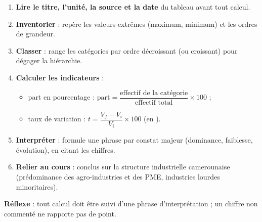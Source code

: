 \documentclass[11pt]{article}
\begin{document}
\begin{methode}
\begin{enumerate}
\item \textbf{Lire le titre, l'unité, la source et la date} du tableau avant tout calcul.
\item \textbf{Inventorier} : repère les valeurs extrêmes (maximum, minimum) et les ordres de grandeur.
\item \textbf{Classer} : range les catégories par ordre décroissant (ou croissant) pour dégager la hiérarchie.
\item \textbf{Calculer les indicateurs} :
\begin{itemize}
\item part en pourcentage : $\text{part} = \dfrac{\text{effectif de la catégorie}}{\text{effectif total}} \times 100$ ;
\item taux de variation : $t = \dfrac{V_f - V_i}{V_i} \times 100$ (en \text{\%}).
\end{itemize}
\item \textbf{Interpréter} : formule une phrase par constat majeur (dominance, faiblesse, évolution), en citant les chiffres.
\item \textbf{Relier au cours} : conclus sur la structure industrielle camerounaise (prédominance des agro-industries et des PME, industries lourdes minoritaires).
\end{enumerate}
\textbf{Réflexe} : tout calcul doit être suivi d'une phrase d'interprétation ; un chiffre non commenté ne rapporte pas de point.
\end{methode}
\end{document}
